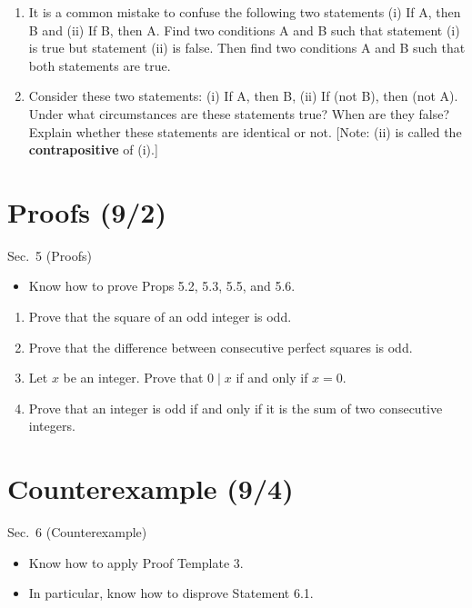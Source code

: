 \documentclass[11pt]{article}
\begin{document}
\begin{enumerate}
\item It is a common mistake to confuse the following two statements (i) If A, then B and (ii) If B, then A. Find two conditions A and B such that statement (i) is true but statement (ii) is false. Then find two conditions A and B such that both statements are true.
\item Consider these two statements: (i) If A, then B, (ii) If (not B), then (not A). Under what circumstances are these statements true? When are they false? Explain whether these statements are identical or not. [Note: (ii) is called the \textbf{contrapositive} of (i).]
\end{enumerate}

\section*{Proofs (9/2)}
\begin{textbook}{Sec.~5 (Proofs)}
\begin{itemize}[leftmargin=*, nosep]
\item Know how to prove Props 5.2, 5.3, 5.5, and 5.6.
\end{itemize}
\end{textbook}

\begin{enumerate}
\item Prove that the square of an odd integer is odd.
\item Prove that the difference between consecutive perfect squares is odd.
\item Let $x$ be an integer. Prove that $0 \mid x$ if and only if $x=0$.
\item Prove that an integer is odd if and only if it is the sum of two consecutive integers.
\end{enumerate}

\section*{Counterexample (9/4)}
\begin{textbook}{Sec.~6 (Counterexample)}
\begin{itemize}[leftmargin=*, nosep]
\item Know how to apply Proof Template 3.
\item In particular, know how to disprove Statement 6.1.
\end{itemize}
\end{textbook}
\end{document}

